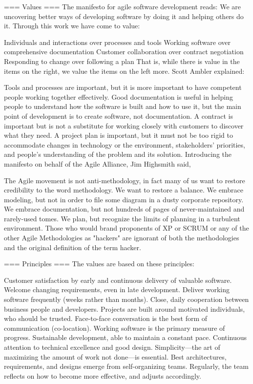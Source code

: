 === Values ===
The manifesto for agile software development reads:
We are uncovering better ways of developing software by doing it and helping others do it. Through this work we have come to value:

  Individuals and interactions over processes and tools 
  Working software over comprehensive documentation 
  Customer collaboration over contract negotiation 
  Responding to change over following a plan 
That is, while there is value in the items on the right, we value the items on the left more.
Scott Ambler explained:

Tools and processes are important, but it is more important to have competent people working together effectively.
Good documentation is useful in helping people to understand how the software is built and how to use it, but the main point of development is to create software, not documentation.
A contract is important but is not a substitute for working closely with customers to discover what they need.
A project plan is important, but it must not be too rigid to accommodate changes in technology or the environment, stakeholders' priorities, and people's understanding of the problem and its solution.
Introducing the manifesto on behalf of the Agile Alliance, Jim Highsmith said,

The Agile movement is not anti-methodology, in fact many of us want to restore credibility to the word methodology. We want to restore a balance. We embrace modeling, but not in order to file some diagram in a dusty corporate repository. We embrace documentation, but not hundreds of pages of never-maintained and rarely-used tomes. We plan, but recognize the limits of planning in a turbulent environment. Those who would brand proponents of XP or SCRUM or any of the other Agile Methodologies as "hackers" are ignorant of both the methodologies and the original definition of the term hacker.


=== Principles ===
The values are based on these principles:

Customer satisfaction by early and continuous delivery of valuable software.
Welcome changing requirements, even in late development.
Deliver working software frequently (weeks rather than months).
Close, daily cooperation between business people and developers.
Projects are built around motivated individuals, who should be trusted.
Face-to-face conversation is the best form of communication (co-location).
Working software is the primary measure of progress.
Sustainable development, able to maintain a constant pace.
Continuous attention to technical excellence and good design.
Simplicity—the art of maximizing the amount of work not done—is essential.
Best architectures, requirements, and designs emerge from self-organizing teams.
Regularly, the team reflects on how to become more effective, and adjusts accordingly.


